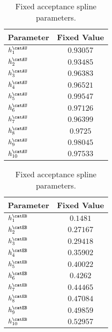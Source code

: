 \begin{table}[htb]
\caption{Fixed \catAU acceptance spline parameters.}
\label{tab:app:measurement_of_sin2beta:cpv_measurement:fixed_parameters:acc:au}
\centering
\begin{tabular}{lr@{$\,\pm\,$}l}
  \toprule
  Parameter              & \multicolumn{2}{c}{Fixed Value} \\
  \midrule
    $h_1^\text{\catAU}$  & \multicolumn{2}{c}{$0.93057$}\\
    $h_2^\text{\catAU}$  & \multicolumn{2}{c}{$0.93485$}\\
    $h_3^\text{\catAU}$  & \multicolumn{2}{c}{$0.96383$}\\
    $h_4^\text{\catAU}$  & \multicolumn{2}{c}{$0.96521$}\\
    $h_5^\text{\catAU}$  & \multicolumn{2}{c}{$0.99547$}\\
    $h_6^\text{\catAU}$  & \multicolumn{2}{c}{$0.97126$}\\
    $h_7^\text{\catAU}$  & \multicolumn{2}{c}{$0.96399$}\\
    $h_8^\text{\catAU}$  & \multicolumn{2}{c}{$0.9725$}\\
    $h_9^\text{\catAU}$  & \multicolumn{2}{c}{$0.98045$}\\
    $h_{10}^\text{\catAU}$ & \multicolumn{2}{c}{$0.97533$}\\
    \bottomrule
\end{tabular}
\end{table}
%
\begin{table}[htb]
\caption{Fixed \catEB acceptance spline parameters.}
\label{tab:app:measurement_of_sin2beta:cpv_measurement:fixed_parameters:acc:eb}
\centering
\begin{tabular}{lr@{$\,\pm\,$}l}
  \toprule
  Parameter               & \multicolumn{2}{c}{Fixed Value} \\
  \midrule  
    $h_1^\text{\catEB}$   & \multicolumn{2}{c}{$0.1481$}\\
    $h_2^\text{\catEB}$   & \multicolumn{2}{c}{$0.27167$}\\
    $h_3^\text{\catEB}$   & \multicolumn{2}{c}{$0.29418$}\\
    $h_4^\text{\catEB}$   & \multicolumn{2}{c}{$0.35902$}\\
    $h_5^\text{\catEB}$   & \multicolumn{2}{c}{$0.40022$}\\
    $h_6^\text{\catEB}$   & \multicolumn{2}{c}{$0.4262$}\\
    $h_7^\text{\catEB}$   & \multicolumn{2}{c}{$0.44465$}\\
    $h_8^\text{\catEB}$   & \multicolumn{2}{c}{$0.47084$}\\
    $h_9^\text{\catEB}$   & \multicolumn{2}{c}{$0.49859$}\\
    $h_{10}^\text{\catEB}$ & \multicolumn{2}{c}{$0.52957$}\\
    \bottomrule
\end{tabular}
\end{table}

